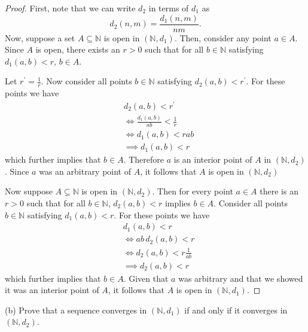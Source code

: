 \documentclass{article}
\newcommand{\N}{\mathbb{N}}
\begin{document}
\begin{proof}

First, note that we can write $d_2$ in terms of $d_1$ as
%
\begin{equation*}
    d_2(n, m) = \frac{d_1(n, m)}{n m}
    .
\end{equation*}
Now, suppose a set $A \subseteq \N$ is open in $(\N, d_1)$. Then,
consider any point $a \in A$. Since $A$ is open, there exists an $r > 0$
such that for all $b \in \N$ satisfying $d_1(a, b) < r$, $b \in A$.

Let $r^\prime = \frac{1}{r}$. Now consider all points $b \in
\N$ satisfying $d_2(a, b) < r^\prime$. For these points we have
%
\begin{align*}
    &d_2(a, b) < r^\prime \\
    &\iff \frac{d_1(a, b)}{a b} < \frac{1}{r} \\
    &\iff d_1(a, b) < r a b  \\
    &\implies d_1(a, b) < r
\end{align*}
%
which further implies that $b \in A$. Therefore $a$ is an interior point
of $A$ in $(\N, d_2)$. Since $a$ was an arbitrary point of $A$, it
follows that $A$ is open in $(\N, d_2)$

Now suppose $A \subseteq \N$ is open in $(\N, d_2)$. Then for every
point $a \in A$ there is an $r > 0$ such that for all $b \in \N$,
$d_2(a, b) < r$ implies $b \in A$.
%
Consider all points $b \in \N$ satisfying $d_1(a, b) < r$. For these
points we have
%
\begin{align*}
    &d_1(a, b) < r \\
    &\iff a b \, d_2(a, b) < r \\
    &\iff d_2(a, b) < r \frac{1}{a b} \\
    &\implies d_2(a, b) < r
\end{align*}
%
which further implies that $b \in A$. Given that $a$ was arbitrary and
that we showed it was an interior point of $A$, it follows that $A$ is
open in $(\N, d_1)$.

\end{proof}

\newpage

(b) Prove that a sequence converges in $(\N, d_1)$ if and only if it
converges in $(\N, d_2)$.
\end{document}
